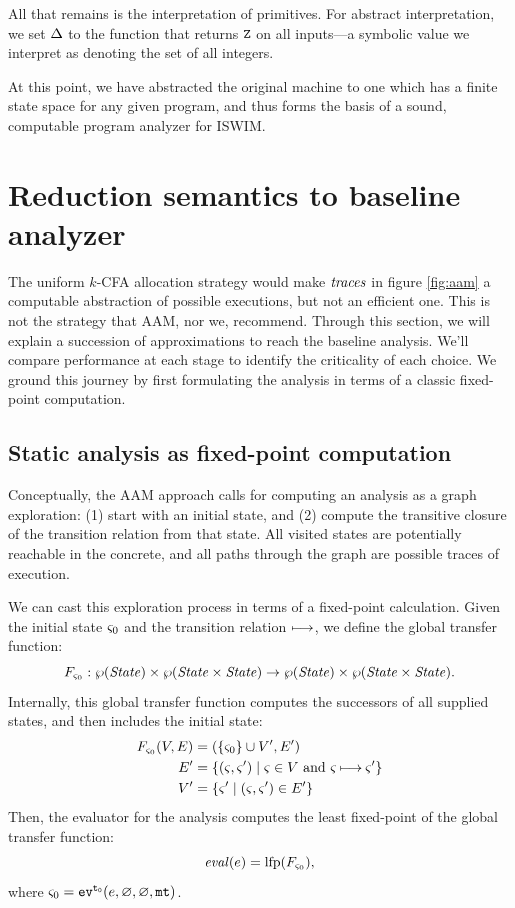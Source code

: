 \documentclass[preprint,onecolumn,9pt]{sigplanconf} %
\begin{document}
All that remains is the interpretation of primitives.  For abstract
interpretation, we set $\interpdelta$ to the function that returns
$\sNum$ on all inputs---a symbolic value we interpret as denoting the
set of all integers.

At this point, we have abstracted the original machine to one which
has a finite state space for any given program, and thus forms the
basis of a sound, computable program analyzer for ISWIM.

\section{Reduction semantics to baseline analyzer}
\label{sec:baseline}

The uniform $k$-CFA allocation strategy would make $\traces$ in figure
\ref{fig:aam} a computable abstraction of possible executions, but not an
efficient one. This is not the strategy that AAM, nor we, recommend. Through
this section, we will explain a succession of approximations
to reach the baseline analysis.  We'll compare performance at each stage to
identify the criticality of each choice.
%
We ground this journey by first formulating the analysis in terms of a classic
fixed-point computation.


\subsection{Static analysis as fixed-point computation}
\label{sec:fixpoint}

Conceptually, the AAM approach calls for computing an analysis as a
graph exploration: (1) start with an initial state, and (2) compute
the transitive closure of the transition relation from that state. All
visited states are potentially reachable in the concrete, and all
paths through the graph are possible traces of execution.

We can cast this exploration process in terms of a fixed-point calculation.
%
Given the initial state $\mstate_0$ and the transition relation $\machstep$,
we define the global transfer function:
\begin{equation*}
 F_{\mstate_0} : \wp(\State) \times \wp(\State\times\State) \to \wp(\State) \times \wp(\State\times\State)\text.
\end{equation*}
Internally, this global transfer function computes the successors of all supplied states, and then includes the initial state:
\begin{align*}
  F_{\mstate_0}(V,E) &= (\{ \mstate_0 \} \cup V', E') \\
    E' &= \setof{ (\mstate,\mstate') \mid \mstate \in V \text{ and } \mstate \machstep \mstate'} \\
    V' &= \setof{ \mstate' \mid (\mstate,\mstate') \in E'}
\end{align*}
Then, the evaluator for the analysis computes the least fixed-point of the global transfer function:
\begin{equation*}
 \eval(\mexp) = \mathrm{lfp}(F_{\mstate_0})\text{,}
\end{equation*}
where $\mstate_0 = \ev[^\mtcntr]{\mexp, \varnothing, \varnothing, \kmt}$.
\end{document}
